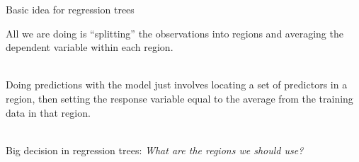 \documentclass[mathserif, aspectratio=169]{beamer}
\begin{document}
\begin{frame}{Basic idea for regression trees}

\begin{center}
All we are doing is ``splitting'' the observations into regions and averaging the dependent variable within each region.\\~\\
\pause

Doing predictions with the model just involves locating a set of predictors in a region, then setting the response variable equal to the average from the training data in that region.  \\~\\
\pause

Big decision in regression trees: \textit{What are the regions we should use?}

\end{center}\end{frame}
\end{document}
